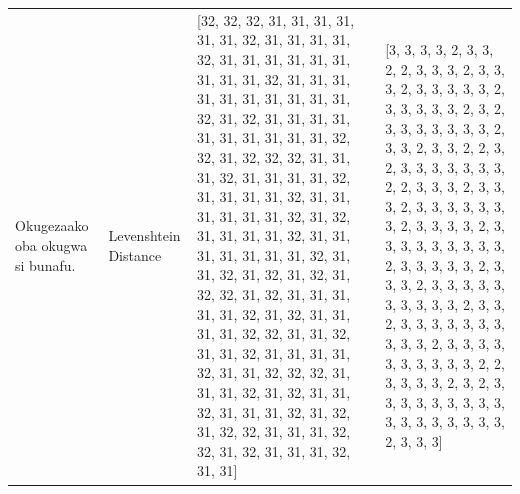 \begin{tabular}{llll}
\multirow[t]{4}{*}{Okugezaako oba okugwa si bunafu.} & Levenshtein Distance & [32, 32, 32, 31, 31, 31, 31, 31, 31, 32, 31, 31, 31, 31, 32, 31, 31, 31, 31, 31, 31, 31, 31, 31, 32, 31, 31, 31, 31, 31, 31, 31, 31, 31, 31, 32, 31, 32, 31, 31, 31, 31, 31, 31, 31, 31, 31, 31, 32, 32, 31, 32, 32, 32, 31, 31, 31, 32, 31, 31, 31, 31, 32, 31, 31, 31, 31, 32, 31, 31, 31, 31, 31, 31, 32, 31, 32, 31, 31, 31, 31, 32, 31, 31, 31, 31, 31, 31, 31, 32, 31, 31, 32, 31, 32, 31, 32, 31, 32, 32, 31, 32, 31, 31, 31, 31, 31, 32, 31, 32, 31, 31, 31, 31, 32, 32, 31, 31, 32, 31, 31, 32, 31, 31, 31, 31, 32, 31, 31, 32, 32, 32, 31, 31, 31, 32, 31, 32, 31, 31, 32, 31, 31, 31, 32, 31, 32, 31, 32, 32, 31, 31, 31, 32, 32, 31, 32, 31, 31, 31, 32, 31, 31] & [3, 3, 3, 3, 2, 3, 3, 2, 2, 3, 3, 3, 2, 3, 3, 3, 2, 3, 3, 3, 3, 3, 2, 3, 3, 3, 3, 3, 2, 3, 2, 3, 3, 3, 3, 3, 3, 3, 2, 3, 3, 2, 3, 3, 2, 2, 3, 2, 3, 3, 3, 3, 3, 3, 3, 2, 2, 3, 3, 3, 2, 3, 3, 3, 2, 3, 3, 3, 3, 3, 3, 3, 2, 3, 3, 3, 3, 2, 3, 3, 3, 3, 3, 3, 3, 3, 3, 2, 3, 3, 3, 3, 3, 2, 3, 3, 3, 2, 3, 3, 3, 3, 3, 3, 3, 3, 3, 3, 2, 3, 3, 2, 3, 3, 3, 3, 3, 3, 3, 3, 3, 3, 2, 3, 3, 3, 3, 3, 3, 3, 3, 3, 3, 2, 2, 3, 3, 3, 3, 2, 3, 2, 3, 3, 3, 3, 3, 3, 3, 3, 3, 3, 3, 3, 3, 3, 3, 3, 3, 2, 3, 3, 3] \\

\end{tabular}
